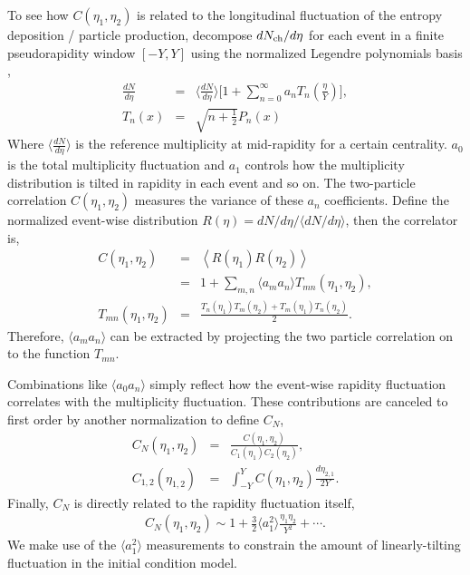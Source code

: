 To see how $C(\eta_1, \eta_2)$ is related to the longitudinal fluctuation of the entropy deposition / particle production, decompose $dN_\text{ch}/d\eta$ for each event in a finite pseudorapidity window $[-Y, Y]$ using the normalized Legendre polynomials basis \cite{Bzdak:2012tp, Jia:2015jga, ATLAS:2015kla},
\begin{eqnarray}
\frac{dN}{d\eta} &=& \biggl\langle\frac{dN}{d\eta}\biggr\rangle \biggl[1 + \sum_{n=0}^\infty a_n T_n\left(\frac{\eta}{Y}\right) \biggr],\\
T_n(x) &=& \sqrt{n + \frac{1}{2}} P_n(x)
\end{eqnarray}
Where $\langle\frac{dN}{d\eta}\rangle$ is the reference multiplicity at mid-rapidity for a certain centrality.
$a_0$ is the total multiplicity fluctuation and $a_1$ controls how the multiplicity distribution is tilted in rapidity in each event and so on.
The two-particle correlation $C(\eta_1, \eta_2)$ measures the variance of these $a_n$ coefficients.
Define the normalized event-wise distribution $R(\eta) = dN/d\eta /\langle dN/d\eta\rangle$, then the correlator is,
\begin{eqnarray}
C(\eta_1, \eta_2) &=& \left\langle R(\eta_1) R(\eta_2)\right\rangle \\
&=& 1 + \sum_{m, n}\langle a_m a_n\rangle  T_{mn}(\eta_1, \eta_2),\\
T_{mn}(\eta_1, \eta_2) &=& \frac{T_n(\eta_1)T_m(\eta_2) + T_m(\eta_1)T_n(\eta_2)}{2}.
\end{eqnarray}
Therefore, $\langle a_m a_n\rangle$ can be extracted by projecting the two particle correlation on to the function $T_{mn}$.

Combinations like $\langle a_0 a_n\rangle$ simply reflect how the event-wise rapidity fluctuation correlates with the multiplicity fluctuation. 
These contributions are canceled to first order by another normalization to define $C_N$,
\begin{eqnarray}
 C_N(\eta_1, \eta_2) &=& \frac{C(\eta_1, \eta_2)}{C_1(\eta_1)C_2(\eta_2)},\\
C_{1,2}(\eta_{1,2}) &=& \int_{-Y}^{Y}C(\eta_1, \eta_2)\frac{d\eta_{2,1}}{2Y}.
\end{eqnarray}
Finally, $C_N$ is directly related to the rapidity fluctuation itself,
\begin{eqnarray}
C_N(\eta_1, \eta_2) \sim 1 + \frac{3}{2}\langle a_1 ^2 \rangle \frac{\eta_1\eta_2}{Y^2} + \cdots.
\end{eqnarray}
We make use of the $\langle a_1 ^2 \rangle$ measurements to constrain the amount of linearly-tilting fluctuation in the initial condition model.


